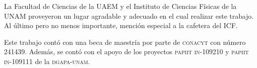 La Facultad de Ciencias de la UAEM y el Instituto de Ciencias Físicas de la UNAM proveyeron un lugar agradable y adecuado en el cual realizar este trabajo. Al último pero no menos importante, mención especial a la cafetera del ICF.

\bigskip

Este trabajo cont\'o con una beca de maestr\'ia por parte de \textsc{conacyt} con n\'umero 241439.
Adem\'as, se cont\'o con el apoyo de los proyectos \textsc{papiit in-109210} y \textsc{papiit in-109111} de la \textsc{dgapa-unam}.
\endgroup



